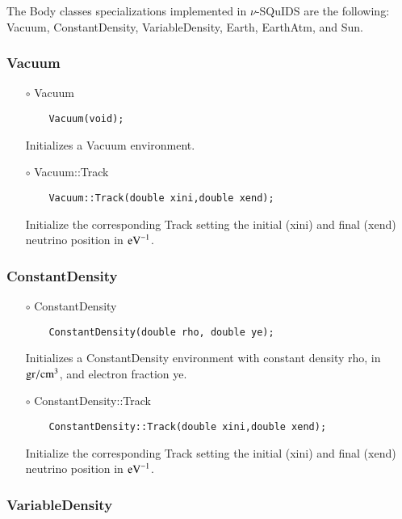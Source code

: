 The {\ttf Body} classes specializations implemented in $\nu$-SQuIDS are the following: {\ttf Vacuum}, {\ttf ConstantDensity}, {\ttf VariableDensity}, {\ttf Earth}, {\ttf EarthAtm}, and {\ttf Sun}.

\subsubsection{Vacuum}

\begin{itemize}
\item[$\circ$] {\ttf Vacuum}
  \begin{lstlisting}
    Vacuum(void);
  \end{lstlisting}
  Initializes a {\ttf Vacuum} environment. 
\item[$\circ$] {\ttf Vacuum::Track}
  \begin{lstlisting}
    Vacuum::Track(double xini,double xend);
  \end{lstlisting}
  Initialize the corresponding {\ttf Track} setting the initial ({\ttf xini}) and final ({\ttf xend}) neutrino position in ${\rm eV}^{-1}$.
\end{itemize}

\subsubsection{ConstantDensity}

\begin{itemize}
\item[$\circ$] {\ttf ConstantDensity}
  \begin{lstlisting}
    ConstantDensity(double rho, double ye);
  \end{lstlisting}
  Initializes a {\ttf ConstantDensity} environment with constant density {\ttf rho}, in ${\rm gr}/{\rm cm}^3$, and electron fraction {\ttf ye}.
\item[$\circ$] {\ttf ConstantDensity::Track}
  \begin{lstlisting}
    ConstantDensity::Track(double xini,double xend);
  \end{lstlisting}
  Initialize the corresponding {\ttf Track} setting the initial ({\ttf xini}) and final ({\ttf xend}) neutrino position in ${\rm eV}^{-1}$.
\end{itemize}

\subsubsection{VariableDensity}

